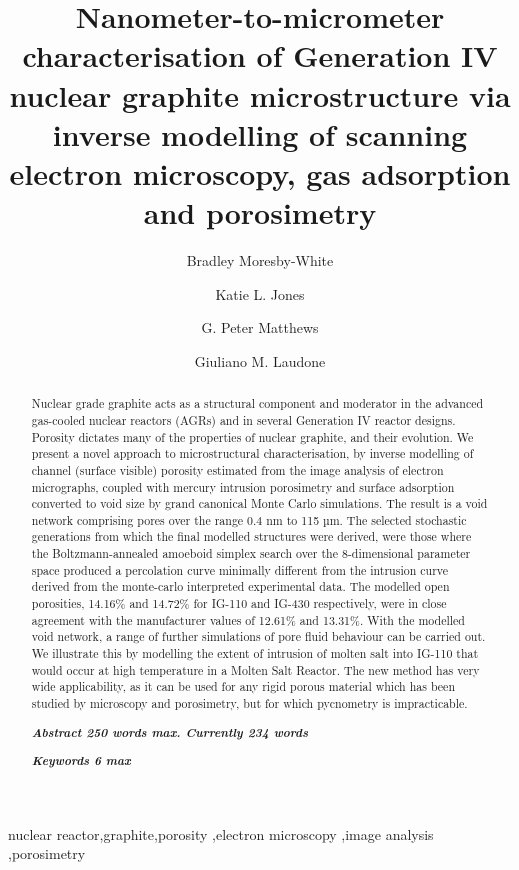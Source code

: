\documentclass[review]{elsarticle}
\begin{document}
\begin{frontmatter}
\title{Nanometer-to-micrometer characterisation of Generation IV nuclear graphite microstructure via inverse modelling of scanning electron microscopy, gas adsorption and porosimetry}
\author[plym]{Bradley Moresby-White}
\author[plym]{Katie L. Jones}
\author[plym]{G. Peter Matthews}
\author[plym]{Giuliano M. Laudone}
\address[plym]{Faculty of Science and Engineering, University of Plymouth, Plymouth, UK}
\begin{abstract}

Nuclear grade graphite acts as a structural component and moderator in the
advanced gas-cooled nuclear reactors (AGRs) and in several
Generation IV reactor designs. Porosity dictates many of the properties of nuclear graphite, and their evolution.
We present a novel approach to microstructural characterisation, by inverse modelling of channel
(surface visible) porosity estimated from the image analysis of electron micrographs, coupled with mercury intrusion porosimetry and surface adsorption converted to void size by grand canonical Monte Carlo simulations. The result is a void network comprising pores over the range 0.4 nm to 115 µm. The selected stochastic generations from which the final modelled structures were derived, were those where the Boltzmann-annealed
amoeboid simplex search over the 8-dimensional parameter space produced a percolation
curve minimally different from the intrusion curve derived from the monte-carlo interpreted
experimental data.  The modelled open porosities, 14.16\% and 14.72\% for IG-110 and IG-430 respectively,
were in close agreement with the manufacturer values of 12.61\% and 13.31\%. 
With the modelled void network, a range of further simulations of pore fluid behaviour can be carried
out. We illustrate this by modelling the extent of intrusion of molten salt into IG-110 that would occur at high temperature in a Molten Salt Reactor.  The new method has very wide applicability, as it can be used for any rigid porous material which has been studied by microscopy and porosimetry, but for which pycnometry is impracticable.
\begin{draftversion}
	\newline
	\textit{\textbf{Abstract 250 words max.  Currently 234 words}}
\end{draftversion}
\begin{draftversion}
	\newline
	\textit{\textbf{Keywords 6 max}}
\end{draftversion}

\end{abstract}
\begin{keyword} nuclear reactor\sep graphite\sep porosity \sep electron
microscopy \sep image analysis \sep porosimetry \end{keyword}
\end{frontmatter}
\end{document}
